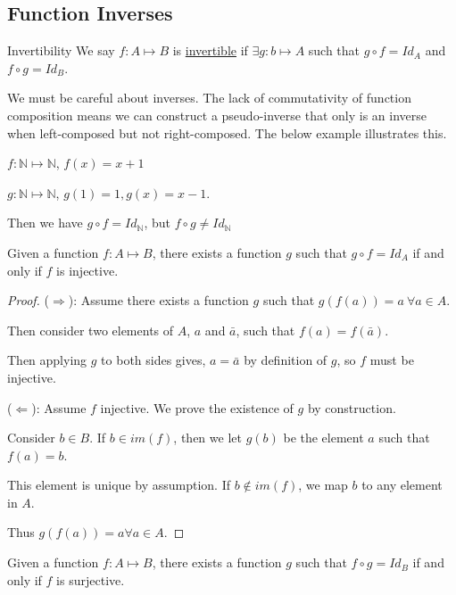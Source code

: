 \documentclass[../Main.tex]{subfiles}
\begin{document}
\subsection{Function Inverses}
\begin{definition}{Invertibility}
    We say $f : A \mapsto B$ is \underline{invertible} if $\exists g : b \mapsto A$ such that $g \circ f = Id_A$ and $f \circ g = Id_B$.
\end{definition}
We must be careful about inverses. The lack of commutativity of function composition means we can construct a pseudo-inverse that only is an inverse when left-composed but not right-composed. The below example illustrates this.
\begin{example}
    $f : \mathbb{N} \mapsto \mathbb{N}$, $f(x) = x + 1$\par
    $g : \mathbb{N} \mapsto \mathbb{N}$, $g(1) = 1, g(x) = x - 1$.\par
    Then we have $g \circ f = Id_\mathbb{N}$, but $f \circ g \neq Id_\mathbb{N}$
\end{example}
\begin{proposition}
    Given a function $f : A \mapsto B$, there exists a function $g$ such that $g \circ f = Id_A$ if and only if $f$ is injective.
    \label{propInjectiveIffLeftInverse}
\end{proposition}
\begin{proof}
    ($\Rightarrow$): Assume there exists a function $g$ such that $g(f(a)) = a~\forall a \in A$.\par
    Then consider two elements of $A$, $a$ and $\bar{a}$, such that $f(a) = f(\bar{a})$.\par
    Then applying $g$ to both sides gives, $a = \bar{a}$ by definition of $g$, so $f$ must be injective.\par
    ($\Leftarrow$): Assume $f$ injective. We prove the existence of $g$ by construction.\par
    Consider $b \in B$. If $b \in im(f)$, then we let $g(b)$ be the element $a$ such that $f(a) = b$.\par
    This element is unique by assumption. If $b \notin im(f)$, we map $b$ to any element in $A$.\par
    Thus $g(f(a)) = a \forall a \in A$.
\end{proof}
\begin{proposition}
    Given a function $f : A \mapsto B$, there exists a function $g$ such that $f \circ g = Id_B$ if and only if $f$ is surjective.
    \label{propSurjectiveIffRightInverse}
\end{proposition}
\end{document}
